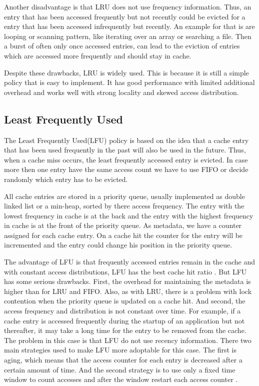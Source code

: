 \documentclass[
	12pt,
	a4paper,
	abstract,
	bibliography=totoc,
	chapterprefix,
	headings=openright,
	numbers=endperiod,
	parskip=half,
	twoside,
]{scrreprt}
\begin{document}
Another disadvantage is that LRU does not use frequency information.
Thus, an entry that has been accessed frequently but not recently could be evicted for a entry that has been accessed infrequently but recently.
An example for that is are looping or scanning pattern, like iterating over an array or searching a file.
Then a burst of often only once accessed entries, can lead to the eviction of entries which are accessed more frequently and should stay in cache.

Despite these drawbacks, LRU is widely used.
This is because it is still a simple policy that is easy to implement.
It has good performance with limited additional overhead and works well with strong locality and skewed access distribution.

\subsection{Least Frequently Used}

The Least Frequently Used(LFU) policy is based on the idea that a cache entry that has been used frequently in the past will also be used in the future.
Thus, when a cache miss occurs, the least frequently accessed entry is evicted.
In case more then one entry have the same access count we have to use FIFO or decide randomly which entry has to be evicted.

All cache entries are stored in a priority queue, usually implemented as double linked list or a min-heap, sorted by there access frequency.
The entry with the lowest frequency in cache is at the back and the entry with the highest frequency in cache is at the front of the priority queue.
As metadata, we have a counter assigned for each cache entry.
On a cache hit the counter for the entry will be incremented and the entry could change his position in the priority queue.

The advantage of LFU is that frequently accessed entries remain in the cache and with constant
access distributions, LFU has the best cache hit ratio \cite{einziger2017tinylfu}.
But LFU has some  serious drawbacks.
First, the overhead for maintaining the metadata is higher than for LRU and FIFO.
Also, as with LRU, there is a problem with lock contention when the priority queue is updated on a cache hit.
And second, the access frequency and distribution is not constant over time.
For example, if a cache entry is accessed frequently during the startup of an application but not thereafter, it may take a long time for the entry to be removed from the cache.
The problem in this case is that LFU do not use recency information.
There two main strategies used to make LFU more adoptable for this case.
The first is aging, which means that the access counter for each entry is decreased after  a certain amount of time.
And the second strategy is to use only a fixed time window to count accesses and after the window restart each access counter \cite{karakostas2000practical}.
\end{document}
